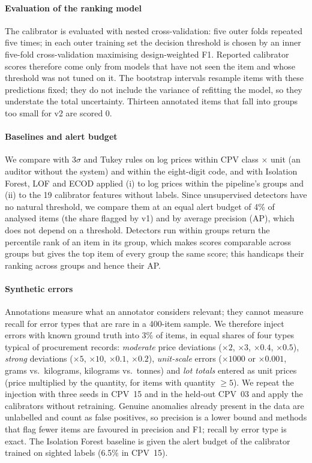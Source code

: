 \documentclass[conference]{IEEEtran}
\begin{document}
\paragraph{Evaluation of the ranking model} The calibrator is evaluated with nested cross-validation: five outer
folds repeated five times; in each outer training set the decision threshold is chosen by an inner
five-fold cross-validation maximising design-weighted F1. Reported calibrator scores therefore come only
from models that have not seen the item and whose threshold was not tuned on it. The bootstrap intervals
resample items with these predictions fixed; they do not include the variance of refitting the model, so
they understate the total uncertainty. Thirteen annotated items that fall into groups too small for v2 are
scored 0.

\paragraph{Baselines and alert budget} We compare with 3$\sigma$ and Tukey rules on log prices within
CPV class $\times$ unit (an auditor without the system) and within the eight-digit code, and with
Isolation Forest, LOF and ECOD applied (i) to log prices within the pipeline's groups and (ii) to the 19
calibrator features without labels. Since unsupervised detectors have no natural threshold, we compare them
at an equal alert budget of 4\% of analysed items (the share flagged by v1) and by average precision (AP),
which does not depend on a threshold. Detectors run within groups return the percentile rank of an
item in its group, which makes scores comparable across groups but gives the top item of every group the
same score; this handicaps their ranking across groups and hence their AP.

\paragraph{Synthetic errors} Annotations measure what an annotator considers relevant; they cannot
measure recall for error types that are rare in a 400-item sample. We therefore inject errors with known
ground truth into 3\% of items, in equal shares of four types typical of procurement records:
\emph{moderate} price deviations ($\times2$, $\times3$, $\times0.4$, $\times0.5$), \emph{strong} deviations
($\times5$, $\times10$, $\times0.1$, $\times0.2$), \emph{unit-scale} errors ($\times1000$ or $\times0.001$,
grams vs.\ kilograms, kilograms vs.\ tonnes) and \emph{lot totals} entered as unit prices (price multiplied
by the quantity, for items with quantity $\ge5$). We repeat the injection with three seeds in CPV~15 and in
the held-out CPV~03 and apply the calibrators without retraining. Genuine anomalies already present in the
data are unlabelled and count as false positives, so precision is a lower bound and methods that flag fewer
items are favoured in precision and F1; recall by error type is exact. The Isolation Forest baseline is
given the alert budget of the calibrator trained on sighted labels (6.5\% in CPV~15).
\end{document}
